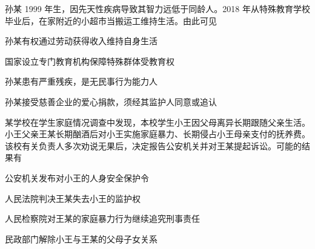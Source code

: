 \documentclass{exam-zh}
\begin{document}
\begin{question}
  孙某 1999 年生，因先天性疾病导致其智力远低于同龄人。2018 年从特殊教育学校毕业后，在家附近的小超市当搬运工维持生活。由此可见

   孙某有权通过劳动获得收入维持自身生活

   国家设立专门教育机构保障特殊群体受教育权

   孙某患有严重残疾，是无民事行为能力人

   孙某接受慈善企业的爱心捐款，须经其监护人同意或追认

  \begin{choices}
  \item {}
  \item {}
  \item {}
  \item {}
  \end{choices}
\end{question}

\begin{question}
  某学校在学生家庭情况调查中发现，本校学生小王因父母离异长期跟随父亲生活。小王父亲王某长期酗酒后对小王实施家庭暴力、长期侵占小王母亲支付的抚养费。该校有关负责人多次劝说无果后，决定报告公安机关并对王某提起诉讼。可能的结果有

   公安机关发布对小王的人身安全保护令

   人民法院判决王某失去小王的监护权

   人民检察院对王某的家庭暴力行为继续追究刑事责任

   民政部门解除小王与王某的父母子女关系

  \begin{choices}
  \item {}
  \item {}
  \item {}
  \item {}
  \end{choices}
\end{question}
\end{document}
